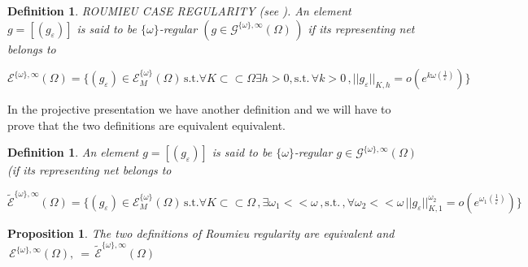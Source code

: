 \documentclass[12pt,a4paper]{amsart}
\newtheorem{proposition}[theorem]{Proposition}
\newtheorem{definition}[theorem]{Definition}
\begin{document}
\begin{definition}

ROUMIEU CASE REGULARITY (see \cite{D.V.V.}).
An element $ g=[(g_\varepsilon)]$ is said to be
 $\{\omega\}$-regular
 $(g\in\mathcal{G}^{\{\omega\},\infty}(\Omega)\,)$ if its representing net belongs to

$$\mathcal{E}^{\{\omega\},\infty}(\Omega) =
  \{(g_{\varepsilon}) \in \mathcal{E}^{\{\omega\}}_M (\Omega)  \, \mbox{s.t.} \forall K \subset \subset \Omega
  \exists h>0 , \mbox{s.t.}\,
\forall k>0\, ,||g_{\varepsilon}||_ {K,h} = o(e^{k\omega(\frac{1}{\varepsilon})} ) \} $$ 
\end{definition}

In the projective presentation we have another definition and we will have to prove that the two definitions are equivalent  equivalent.

    \begin{definition} 
An element $ g=[(g_\varepsilon)]$ is said to be
 $\{\omega\}$-regular
 $g\in\mathcal{G}^{\{\omega\},\infty}(\Omega)$ (if its representing net belongs to
 
 $$\tilde{\mathcal{E}}^{\{\omega\},\infty}(\Omega) =
  \{(g_{\varepsilon}) \in \mathcal{E}^{\{\omega\}}_M (\Omega)  \, \mbox{s.t.} \forall K \subset \subset \Omega\,,
  \exists \omega_1 << \omega\, , \mbox{s.t.} \,,
\forall \omega_2 <<\omega\,
||g_{\varepsilon}||_ {K,1}^{\omega_2} = o(e^{\omega_1(\frac{1}{\varepsilon})} ) \} $$ 
\end{definition}


   \begin{proposition}
The two definitions of Roumieu regularity are equivalent and 
$ \,\mathcal{E}^{\{\omega\},\infty}(\Omega),\ 
=\,\tilde{\mathcal{E}}^{\{\omega\},\infty}(\Omega)$
 \end{proposition}
  
\end{document}
